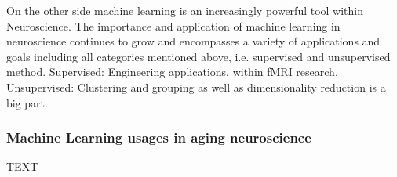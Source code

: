 On the other side machine learning is an increasingly powerful tool within Neuroscience. The importance and application of machine learning in neuroscience continues to grow and encompasses a variety of applications and goals including all categories mentioned above, i.e. supervised and unsupervised method. Supervised: Engineering applications, within fMRI research. Unsupervised: Clustering and grouping as well as dimensionality reduction is a big part.  






\subsubsection{Machine Learning usages in aging neuroscience}
TEXT